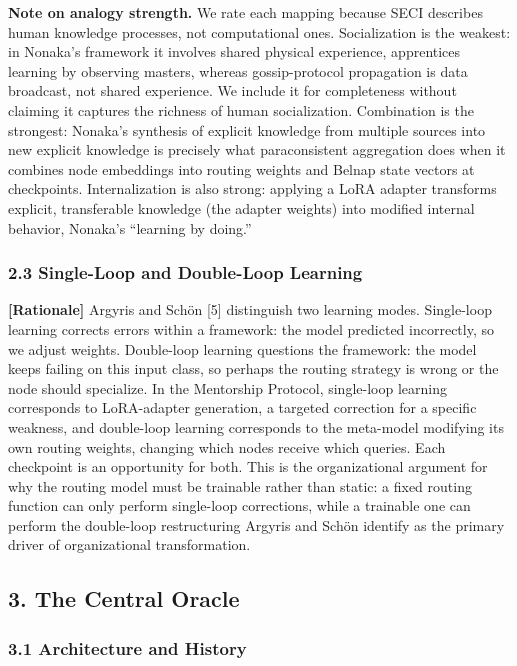\textbf{Note on analogy strength.} We rate each mapping because SECI
describes human knowledge processes, not computational ones.
Socialization is the weakest: in Nonaka's framework it involves shared
physical experience, apprentices learning by observing masters, whereas
gossip-protocol propagation is data broadcast, not shared experience. We
include it for completeness without claiming it captures the richness of
human socialization. Combination is the strongest: Nonaka's synthesis of
explicit knowledge from multiple sources into new explicit knowledge is
precisely what paraconsistent aggregation does when it combines node
embeddings into routing weights and Belnap state vectors at checkpoints.
Internalization is also strong: applying a LoRA adapter transforms
explicit, transferable knowledge (the adapter weights) into modified
internal behavior, Nonaka's ``learning by doing.''

\subsubsection{2.3 Single-Loop and Double-Loop
Learning}\label{single-loop-and-double-loop-learning}

\textbf{{[}Rationale{]}} Argyris and Schön {[}5{]} distinguish two
learning modes. Single-loop learning corrects errors within a framework:
the model predicted incorrectly, so we adjust weights. Double-loop
learning questions the framework: the model keeps failing on this input
class, so perhaps the routing strategy is wrong or the node should
specialize. In the Mentorship Protocol, single-loop learning corresponds
to LoRA-adapter generation, a targeted correction for a specific
weakness, and double-loop learning corresponds to the meta-model
modifying its own routing weights, changing which nodes receive which
queries. Each checkpoint is an opportunity for both. This is the
organizational argument for why the routing model must be trainable
rather than static: a fixed routing function can only perform
single-loop corrections, while a trainable one can perform the
double-loop restructuring Argyris and Schön identify as the primary
driver of organizational transformation.

\subsection{3. The Central Oracle}\label{the-central-oracle}

\subsubsection{3.1 Architecture and
History}\label{architecture-and-history}

